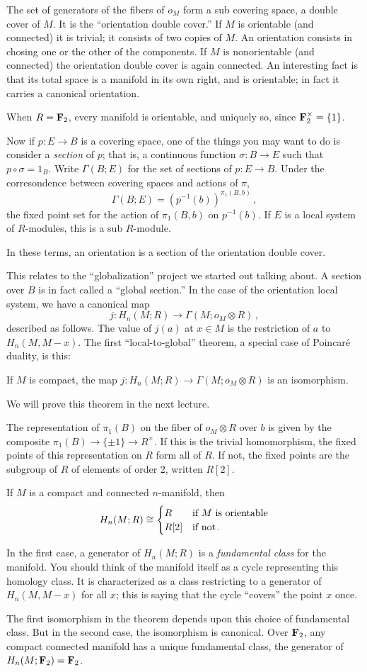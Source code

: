 The set of generators of the fibers of $o_M$ form a sub covering space, 
a double cover of $M$. It is the ``orientation double cover.'' If $M$ is
orientable (and connected) it is trivial; it consists of two copies of $M$. 
An orientation consists in chosing one or the other of the components. 
If $M$ is nonorientable (and connected) the orientation double cover is
again connected. An interesting fact is that its total space is a manifold
in its own right, and is orientable; in fact it carries a canonical 
orientation. 

When $R=\mathbf F_2$, every manifold is orientable, and uniquely so, since 
$\mathbf F_2^\times=\{1\}$. 

Now if $p:E\to B$ is a covering space, one of the things you may want to do 
is consider a {\em section} of $p$; that is, a continuous function 
$\sigma:B\to E$ such that $p\circ\sigma=1_B$. Write $\Gamma(B;E)$ for
the set of sections of $p:E\to B$. Under the corresondence
between covering spaces and actions of $\pi$, 
\[
\Gamma(B;E)=(p^{-1}(b))^{\pi_1(B,b)}\,,
\]
the fixed point set for the action of $\pi_1(B,b)$ on $p^{-1}(b)$. 
If $E$ is a local system of $R$-modules, this is a sub $R$-module. 

In these terms, an orientation is a section of the orientation double cover. 

This relates to the ``globalization'' project we started out talking about. 
A section over $B$ is in fact called a ``global section.'' In the case of
the orientation local system, we have a canonical map
\[
j:H_n(M;R)\to \Gamma(M;o_M\otimes R)\,,
\]
described as follows. The value of $j(a)$ at $x\in M$ is the restriction
of $a$ to $H_n(M,M-x)$. The first ``local-to-global'' theorem, 
a special case of Poincar\'e duality, is this:
\begin{theorem} 
If $M$ is compact, the map $j:H_n(M;R)\to\Gamma(M;o_M\otimes R)$ 
is an isomorphism. 
\end{theorem}

We will prove this theorem in the next lecture.

The representation of $\pi_1(B)$ on the fiber of $o_M\otimes R$ over $b$
is given by the composite $\pi_1(B)\to\{\pm1\}\to R^\times$. If this is the
trivial homomorphism, the fixed points of this representation on $R$ 
form all of $R$. If not, the fixed points are the subgroup of $R$
of elements of order 2, written $R[2]$.
\begin{corollary}
If $M$ is a compact and connected $n$-manifold, then 
\[
H_n(M;R)\cong\begin{cases}R & \hbox{if $M$ is orientable} \\ 
R[2] & \hbox{if not}\,.
\end{cases}
\]
\end{corollary}
In the first case, a generator of $H_n(M;R)$ is a {\em fundamental class} 
for the manifold. You should think of the manifold itself as a cycle
representing this homology class. It is characterized as a class restricting
to a generator of $H_n(M,M-x)$ for all $x$; this is saying that the cycle
``covers'' the point $x$ once.

The first isomorphism in the theorem 
depends upon this choice of fundamental class. But in the second case,
the isomorphism is canonical. Over $\mathbf F_2$, any compact connected manifold 
has a unique fundamental class, the generator of $H_n(M;\mathbf F_2)=\mathbf F_2$. 

